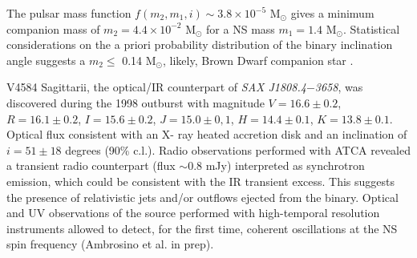 \documentclass[graybox]{svmult}
\def \saxj{{\em SAX J1808.4$-$3658\xspace}}
\begin{document}
The pulsar mass function $f(m_2,m_1,i)\sim 3.8\times 10^{-5}$ M$_\odot$ gives a minimum companion mass of $m_2=4.4\times10^{-2}$ M$_\odot$ for a NS mass $m_1=1.4$ M$_\odot$. Statistical considerations on the a priori probability distribution of the binary inclination angle suggests a $m_2\leq$ 0.14 M$_\odot$, likely, Brown Dwarf companion star \cite{Bildsten2001,Deloye2008,DiSalvo2008}.

V4584 Sagittarii, the optical/IR counterpart of \saxj{}, was discovered during the 1998 outburst with magnitude $V=16.6\pm0.2$, $R=16.1\pm0.2$, $I=15.6\pm0.2$, $J=15.0\pm0,1$, $H=14.4\pm0.1$, $K=13.8\pm0.1$. Optical flux consistent with an X-
ray heated accretion disk and an inclination of $i=51\pm18$ degrees (90\% c.l.)\cite{Wang2001}. Radio observations performed with ATCA revealed a transient radio counterpart (flux $\sim$0.8 mJy) interpreted as synchrotron emission, which could be consistent with the IR transient excess. This suggests the presence of relativistic jets and/or outflows ejected from the binary. 
Optical and UV observations of the source performed with high-temporal resolution instruments allowed to detect, for the first time, coherent oscillations at the NS spin frequency (Ambrosino et al. in prep).
\end{document}
